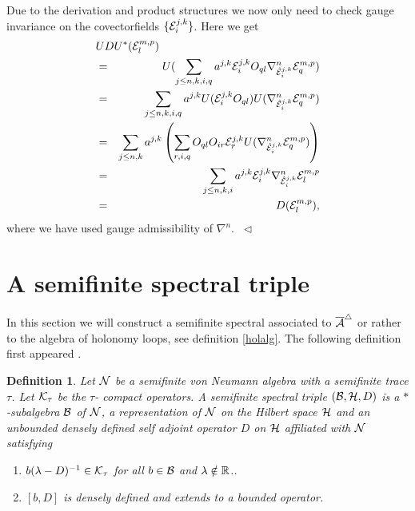 \documentclass[12pt]{article}
\newcommand{\eproof}{{~\hfill$ \triangleleft$}}
\def\ca{{\cal A}}
\def\cb{{\cal B}}
\def\ce{{\cal E}}
\def\ch{{\cal H}}
\def\ck{{\cal K}}
\def\cn{{\cal N}}
\newtheorem{definition}[thm]{Definition}
\newcommand{\bbR}{{\Bbb R}}
\begin{document}
{Due to the derivation and product structures we now only need to check gauge invariance on the covectorfields 
$\{\ce_i^{j,k}\}$. Here we get
\begin{eqnarray*}
 \lefteqn{UDU^*(\ce_l^{m,p})}\\
&=& U (\sum_{j\leq n,k,i,q}a^{j,k}\ce_i^{j,k}O_{ql} \nabla^n_{\hat{\ce}_i^{j,k}} \ce_q^{m,p})\\
&=& \sum_{j\leq n,k,i,q}a^{j,k}U(\ce_i^{j,k}O_{ql}) U( \nabla^n_{\hat{\ce}_i^{j,k}} \ce_q^{m,p})\\
&=&\sum_{j\leq n,k}a^{j,k}\left(\sum_{r,i,q} O_{ql} O_{ir}\ce_r^{j,k}U( \nabla^n_{\hat{\ce}_i^{j,k}} \ce_q^{m,p})\right)\\
&=&\sum_{j\leq n,k,i}a^{j,k}\ce_i^{j,k}\nabla^n_{\hat{\ce}_i^{j,k}}\ce_l^{m,p}\\
&=&D(\ce_l^{m,p}),
\end{eqnarray*}
where we have used gauge admissibility of $\nabla^n$. \eproof








\section{A semifinite spectral triple} \label{semi}
In this section we will construct a semifinite spectral associated to $\overline{\ca}^\triangle$ or rather to the algebra of holonomy loops, see definition \ref{holalg}. The following definition first appeared \cite{CPS}.
\begin{definition}
Let $\cn$ be a semifinite von Neumann algebra with a semifinite trace $\tau$. Let $\ck_\tau$ be the $\tau$- compact operators. A semifinite spectral triple $(\cb ,\ch,D)$ is a $*$-subalgebra $\cb$ of $\cn$, a representation of $\cn$ on the Hilbert space $\ch$ and an unbounded densely defined self adjoint operator $D$ on $\ch$ affiliated with $\cn$ satisfying
\begin{enumerate}
\item $b (\lambda -D)^{-1}\in \ck_\tau$ for all $b\in \cb$ and $\lambda \notin \bbR$.. 
\item $[ b,D ]$ is densely defined and extends to a bounded operator.
\end{enumerate}
\end{definition}

}
\end{document}
